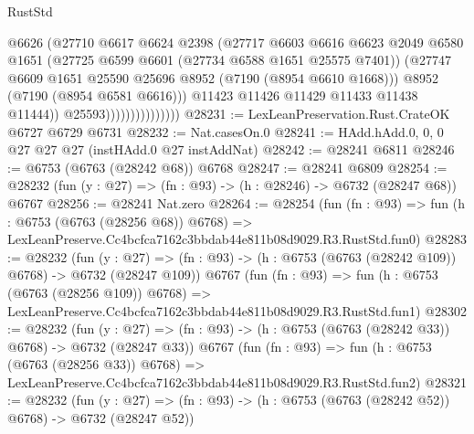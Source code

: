 \begin{lexlean}{RustStd}
\begin{coremodule}
                                    @6626
                                    (@27710
                                      @6617
                                      @6624
                                      @2398
                                      (@27717
                                        @6603
                                        @6616
                                        @6623
                                        @2049
                                        @6580
                                        @1651
                                        (@27725 @6599 @6601 (@27734 @6588 @1651 @25575 @7401))
                                        (@27747
                                          @6609
                                          @1651
                                          @25590
                                          @25696
                                          @8952
                                          (@7190 (@8954 @6610 @1668)))
                                        @8952
                                        (@7190 (@8954 @6581 @6616)))
                                      @11423
                                      @11426
                                      @11429
                                      @11433
                                      @11438
                                      @11444))
                                  @25593)))))))))))))))
@28231 := LexLeanPreservation.Rust.CrateOK @6727 @6729 @6731
@28232 := Nat.casesOn.{0}
@28241 := HAdd.hAdd.{0, 0, 0} @27 @27 @27 (instHAdd.{0} @27 instAddNat)
@28242 := @28241 @6811
@28246 := @6753 (@6763 (@28242 @68)) @6768
@28247 := @28241 @6809
@28254 := @28232 (fun (y : @27) => (fn : @93) -> (h : @28246) -> @6732 (@28247 @68)) @6767
@28256 := @28241 Nat.zero
@28264 := @28254
    (fun (fn : @93) =>
    fun (h : @6753 (@6763 (@28256 @68)) @6768) =>
    LexLeanPreserve.Cc4bcfca7162c3bbdab44e811b08d9029.R3.RustStd.fun0)
@28283 := @28232
    (fun (y : @27) => (fn : @93) -> (h : @6753 (@6763 (@28242 @109)) @6768) -> @6732 (@28247 @109))
    @6767
    (fun (fn : @93) =>
    fun (h : @6753 (@6763 (@28256 @109)) @6768) =>
    LexLeanPreserve.Cc4bcfca7162c3bbdab44e811b08d9029.R3.RustStd.fun1)
@28302 := @28232
    (fun (y : @27) => (fn : @93) -> (h : @6753 (@6763 (@28242 @33)) @6768) -> @6732 (@28247 @33))
    @6767
    (fun (fn : @93) =>
    fun (h : @6753 (@6763 (@28256 @33)) @6768) =>
    LexLeanPreserve.Cc4bcfca7162c3bbdab44e811b08d9029.R3.RustStd.fun2)
@28321 := @28232
    (fun (y : @27) => (fn : @93) -> (h : @6753 (@6763 (@28242 @52)) @6768) -> @6732 (@28247 @52))

\end{coremodule}
\end{lexlean}
